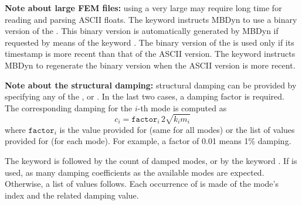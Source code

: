 \textbf{Note about large FEM files:}
using a very large  may require long time for
reading and parsing ASCII floats.
The keyword  instructs MBDyn to use a binary version
of the .
This binary version is automatically generated by MBDyn if requested
by means of the keyword .
The binary version of the  is used only if its
timestamp is more recent than that of the ASCII version.
The keyword  instructs MBDyn to regenerate the
binary version when the ASCII version is more recent.

\textbf{Note about the structural damping:}
structural damping can be provided by specifying any of the
,  or .
In the last two cases, a damping factor is required.
The corresponding damping for the $i$-th mode is computed as
\begin{displaymath}
	c_i = \mathtt{factor}_i \, 2 \sqrt{k_i m_i}
\end{displaymath}
where $\mathtt{factor}_i$ is the value provided
for  (same for all modes) or the list 
of values provided for  (for each mode).
For example, a factor of 0.01 means 1\% damping.

The keyword  is followed by the count of damped modes,
or by the keyword .
If  is used, as many damping coefficients as the available modes
are expected.
Otherwise, a list of  values follows.
Each occurrence of  is made of the mode's index
and the related damping value.


